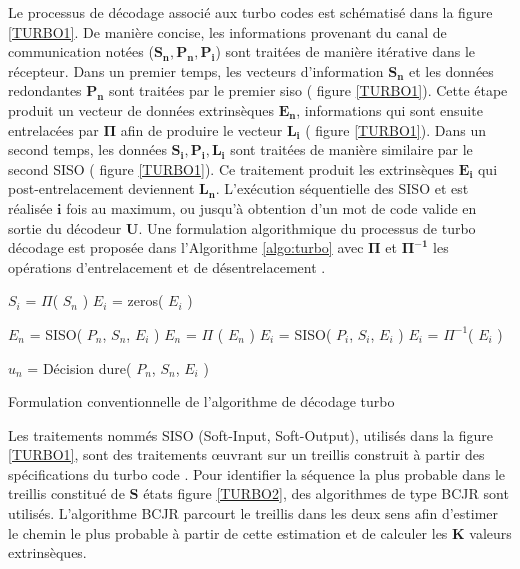 \documentclass[../main.tex]{subfiles}
\begin{document}
Le processus de décodage associé aux turbo codes est schématisé dans la figure \ref{TURBO1}. De manière concise, les informations provenant du canal de communication notées ($\bm{S_n, P_n, P_i}$) sont traitées de manière itérative dans le récepteur. Dans un premier temps, les vecteurs d’information $\bm{S_n}$ et les données redondantes $\bm{P_n}$ sont traitées par le premier \acrshort{siso} ( figure \ref{TURBO1}). Cette étape produit un vecteur de données extrinsèques $\bm{E_n}$, informations qui sont ensuite entrelacées par $\bm{\Pi}$ afin de produire le vecteur $\bm{L_i}$ ( figure \ref{TURBO1}). Dans un second temps, les données $\bm{S_i, P_i, L_i}$ sont traitées de manière similaire par le second SISO ( figure \ref{TURBO1}). Ce traitement produit les extrinsèques $\bm{E_i}$ qui post-entrelacement deviennent $\bm{L_n}$. L’exécution séquentielle des SISO  et  est réalisée $\bm{i}$ fois au maximum, ou jusqu’à obtention d’un mot de code valide en sortie du décodeur $\bm{U}$. Une formulation algorithmique du processus de turbo décodage est proposée dans l’Algorithme \ref{algo:turbo} avec $\bm{\Pi}$ et $\bm{\Pi^{-1}}$ les opérations d’entrelacement et de désentrelacement \cite{TURBO:NEW:INTERL}.

\begin{algorithm}[tb]
    \small
    \begin{algorithmic}[1]
        \State $S_i$ = $\Pi$( $S_n$ )
        \State $E_i$ = zeros( $E_i$ )
        \item[]
        \State $E_n$ = SISO( $P_n$, $S_n$, $E_i$ )
        \State $E_n$ = $\Pi$ ( $E_n$ )
        \State $E_i$ = SISO( $P_i$, $S_i$, $E_i$ )
        \State $E_i$ = $\Pi^{-1}$( $E_i$ )
        \EndFor
        \item[]
        \State $u_n$ = Décision dure( $P_n$, $S_n$, $E_i$ )
        \end{algorithmic}
    \caption{Formulation conventionnelle de l'algorithme de décodage turbo}
    \label{algo:turbo}
\end{algorithm}


Les traitements nommés SISO (Soft-Input, Soft-Output), utilisés dans la figure \ref{TURBO1}, sont des traitements œuvrant sur un treillis construit à partir des spécifications du turbo code \cite{BookCodes}. Pour identifier la séquence la plus probable dans le treillis constitué de $\bm S$ états figure \ref{TURBO2}, des algorithmes de type BCJR \cite{BCJR} sont utilisés. L'algorithme BCJR parcourt le treillis dans les deux sens afin d’estimer le chemin le plus probable à partir de cette estimation et de calculer les $\bm K$ valeurs extrinsèques.
\end{document}
